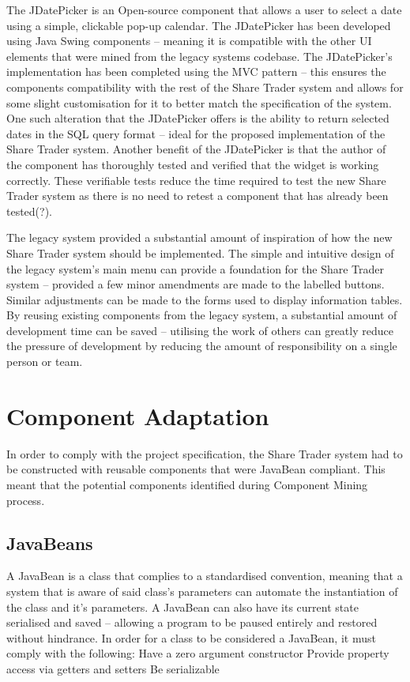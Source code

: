 \documentclass[12pt, a4paper,titlepage]{article}
\begin{document}
The JDatePicker is an Open-source component that allows a user to select a
date using a simple, clickable pop-up calendar. The JDatePicker has been
developed using Java Swing components – meaning it is compatible with the
other UI elements that were mined from the legacy systems codebase. The
JDatePicker's implementation has been completed using the MVC pattern – this
ensures the components compatibility with the rest of the Share Trader system
and allows for some slight customisation for it to better match the
specification of the system. One such alteration that the JDatePicker offers
is the ability to return selected dates in the SQL query format – ideal for
the proposed implementation of the Share Trader system.  Another benefit of
the JDatePicker is that the author of the component has thoroughly tested and
verified that the widget is working correctly. These verifiable tests reduce
the time required to test the new Share Trader system as there is no need to
retest a component that has already been tested(?).

The legacy system provided a substantial amount of inspiration of how the new
Share Trader system should be implemented. The simple and intuitive design of
the legacy system’s main menu can provide a foundation for the Share Trader
system – provided a few minor amendments are made to the labelled buttons.
Similar adjustments can be made to the forms used to display information
tables.  By reusing existing components from the legacy system, a substantial
amount of development time can be saved – utilising the work of others can
greatly reduce the pressure of development by reducing the amount of
responsibility on a single person or team.

\section{Component Adaptation}
In order to comply with the project specification, the  Share Trader system
had to be constructed with reusable components that were JavaBean compliant.
This meant that the potential components identified during Component Mining
process.

\subsection{JavaBeans}
A JavaBean is a class that complies to a standardised convention, meaning that
a system that is aware of said class’s parameters can automate the
instantiation of the class and it’s parameters. A JavaBean can also have its
current state serialised and saved – allowing a program to be paused entirely
and restored without hindrance.  In order for a class to be considered a
JavaBean, it must comply with the following:
Have a zero argument constructor
Provide property access via getters and setters
Be serializable
\end{document}
